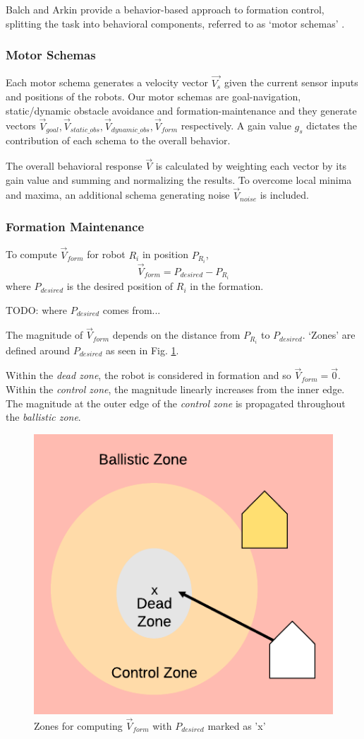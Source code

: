 \documentclass[letterpaper, 10 pt, conference]{ieeeconf}  %
\begin{document}
Balch and Arkin provide a behavior-based approach to formation control, splitting the task into behavioral components, referred to as `motor schemas' \cite{c2}. 

\subsubsection{Motor Schemas}

Each motor schema generates a velocity vector $\vec{V_s}$ given the current sensor inputs and positions of the robots. Our motor schemas are goal-navigation, static/dynamic obstacle avoidance and formation-maintenance and they generate vectors $\vec{V}_{goal}, \vec{V}_{static\_obs}, \vec{V}_{dynamic\_obs}, \vec{V}_{form}$ respectively. A gain value $g_s$ dictates the contribution of each schema to the overall behavior. 

The overall behavioral response $\vec{V}$ is calculated by weighting each vector by its gain value and summing and normalizing the results. To overcome local minima and maxima, an additional schema generating noise $\vec{V}_{noise}$ is included.

\subsubsection{Formation Maintenance}

To compute $\vec{V}_{form}$ for robot $R_i$ in position $P_{R_i}$,
\[\vec{V}_{form} = P_{desired} - P_{R_i}\]
where $P_{desired}$ is the desired position of $R_i$ in the formation.

TODO: where $P_{desired}$ comes from...

The magnitude of $\vec{V}_{form}$ depends on the distance from $P_{R_i}$ to $P_{desired}$. `Zones' are defined around $P_{desired}$ as seen in Fig. \ref{formation_zones}. 

Within the \textit{dead zone}, the robot is considered in formation and so $\vec{V}_{form} = \vec{0}$. Within the \textit{control zone}, the magnitude linearly increases from the inner edge. The magnitude at the outer edge of the \textit{control zone} is propagated throughout the \textit{ballistic zone}.

\begin{figure}[ht]
\centering
\includegraphics[width=0.45\linewidth]{images/formation_zones.png}
\caption{Zones for computing $\vec{V}_{form}$ with $P_{desired}$ marked as 'x'}
\label{formation_zones}
\end{figure}
\end{document}
